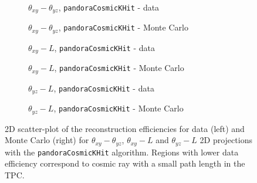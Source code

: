 \documentclass[a4paper]{scrartcl}
\begin{document}
\begin{figure}[htbp]
\begin{subfigure}{0.52\textwidth}
\caption{$\theta_{xy} - \theta_{yz}$, \texttt{pan\-do\-ra\-Co\-smicKHit} - data} \label{fig:2d_pk1}
\end{subfigure}
\begin{subfigure}{0.52\textwidth}
\caption{$\theta_{xy} - \theta_{yz}$, \texttt{pan\-do\-ra\-Co\-smicKHit} - Monte Carlo}\label{fig:2d_pk1_mc}
\end{subfigure}
\begin{subfigure}{0.52\textwidth}
\caption{$\theta_{xy} - L$, \texttt{pan\-do\-ra\-Co\-smicKHit} - data}\label{fig:2d_pk2}
\end{subfigure}
\begin{subfigure}{0.52\textwidth}
\caption{$\theta_{xy} - L$, \texttt{pan\-do\-ra\-Co\-smicKHit} - Monte Carlo}\label{fig:2d_pk2_mc}
\end{subfigure}
\begin{subfigure}{0.52\textwidth}
\caption{$\theta_{yz} - L$, \texttt{pan\-do\-ra\-Co\-smicKHit} - data}\label{fig:2d_pk3}
\end{subfigure}
\begin{subfigure}{0.52\textwidth}
\caption{$\theta_{yz} - L$, \texttt{pan\-do\-ra\-Co\-smicKHit} - Monte Carlo}\label{fig:2d_pk3_mc}
\end{subfigure}
\caption{2D scatter-plot of the reconstruction efficiencies for data (left) and Monte Carlo (right) for $\theta_{xy} - \theta_{yz}$, $\theta_{xy} - L$ and $\theta_{yz} - L$ 2D projections with the \texttt{pandoraCosmicKHit} algorithm. Regions with lower data efficiency correspond to cosmic ray with a small path length in the TPC.} \label{fig:2deff_pandorak}
\end{figure}
\end{document}
